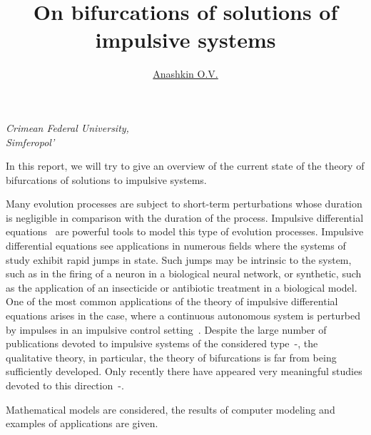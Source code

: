 \documentclass[12pt]{article}
\title{\bf\Large On bifurcations of solutions of impulsive systems}
\author{\underline{Anashkin O.V.}}
\date{}
\begin{document}
	
\begin{center}
	\maketitle
	{\large\textit{Crimean Federal University,\\
			Simferopol'}}
\end{center}

In this report, we will try to give an overview of the current state of the theory of bifurcations of solutions to impulsive systems.

Many evolution processes are subject to short-term perturbations whose duration is negligible in
comparison with the duration of the process. Impulsive differential equations~\cite{samoilenko-perestyuk1987, samoilenko-perestyuk1995} are powerful tools to model this type of evolution processes. Impulsive differential equations see applications in numerous fields where the systems of study exhibit rapid jumps in state. Such jumps may be intrinsic to the system,
such as in the firing of a neuron in a biological neural network, or synthetic, such as the application of
an insecticide or antibiotic treatment in a biological model. One of the most common applications of
the theory of impulsive differential equations arises in the case, where a continuous autonomous
system is perturbed by impulses in an impulsive control setting~\cite{Lakmeche_Arino2001, Xie2017}. Despite the large number of publications devoted to impulsive systems of the considered type~\cite{Hristova}-\cite{Anashkin2021}, the qualitative theory, in particular, the theory of bifurcations  is far from being sufficiently developed. Only recently there have appeared very meaningful studies devoted to this direction~\cite{Church_Liu2017}-\cite{Akhmet_Kashkynbayev2017}.

Mathematical models are considered, the results of computer modeling and examples of applications are given.
\end{document}
